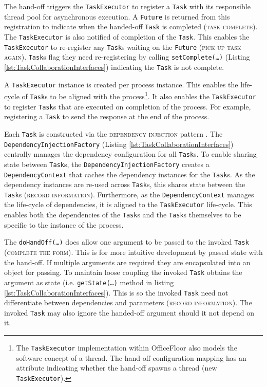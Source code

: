 \documentclass[prodmode]{style/acmlarge}
\begin{document}
The hand-off triggers the \texttt{TaskExecutor} to register a \texttt{Task} with
its responsible thread pool for asynchronous execution.  A \texttt{Future} is
returned from this registration to indicate when the handed-off \texttt{Task} is
completed (\textsc{task complete}).  The \texttt{TaskExecutor} is also notified
of completion of the \texttt{Task}.  This enables the \texttt{TaskExecutor} to
re-register any \texttt{Task}s waiting on the \texttt{Future} (\textsc{pick up
task again}).  \texttt{Task}s flag they need re-registering by calling
\texttt{setComplete(\ldots)} (Listing \ref{lst:TaskCollaborationInterfaces})
indicating the \texttt{Task} is not complete.

A \texttt{TaskExecutor} instance is created per process instance.  This enables
the life-cycle of \texttt{Task}s to be aligned with the process\footnote{The
\texttt{TaskExecutor} implementation within OfficeFloor also models the software
concept of a thread.  The hand-off configuration mapping has an attribute
indicating whether the hand-off spawns a thread (new \texttt{TaskExecutor}).}.
It also enables the \texttt{TaskExecutor} to register \texttt{Task}s that are
executed on completion of the process.  For example, registering a \texttt{Task}
to send the response at the end of the process.

Each \texttt{Task} is constructed via the \textsc{dependency injection} pattern
\cite{ioc}.  The \texttt{Dependency\-InjectionFactory} (Listing
\ref{lst:TaskCollaborationInterfaces}) centrally manages the dependency
configuration for all \texttt{Task}s.  To enable sharing state between
\texttt{Task}s, the \texttt{Dependency\-InjectionFactory} creates a
\texttt{Depend\-ency\-Context} that caches the dependency instances for the
\texttt{Task}s.  As the dependency instances are re-used across \texttt{Task}s,
this shares state between the \texttt{Task}s (\textsc{record information}).
Furthermore, as the \texttt{Dependency\-Context} manages the life-cycle of
dependencies, it is aligned to the \texttt{TaskExecutor} life-cycle.
This enables both the dependencies of the \texttt{Task}s and the \texttt{Task}s
themselves to be specific to the instance of the process.

The \texttt{doHandOff(\ldots)} does allow one argument to be passed to the
invoked \texttt{Task} (\textsc{complete the form}).  This is for more intuitive
development by passed state with the hand-off.  If multiple arguments are
required they are encapsulated into an object for passing.
To maintain loose coupling the invoked \texttt{Task} obtains the argument as
state (i.e. \texttt{getState(\ldots)} method in listing
\ref{lst:TaskCollaborationInterfaces}).  This is so the invoked \texttt{Task}
need not differentiate between dependencies and parameters (\textsc{record
information}).  The invoked \texttt{Task} may also ignore the handed-off
argument should it not depend on it.
\end{document}
